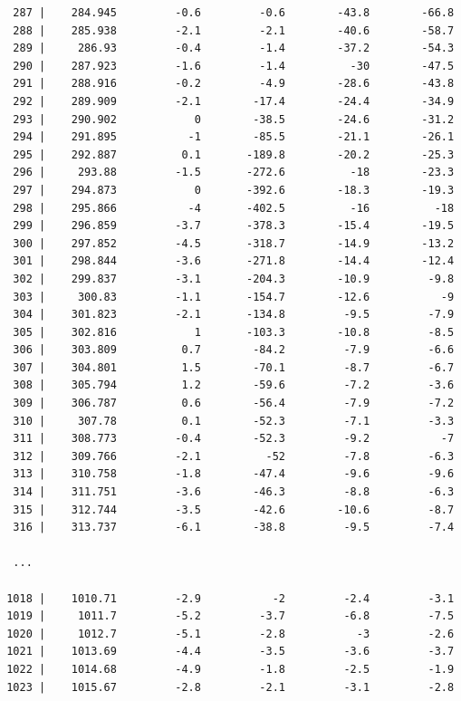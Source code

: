 \documentclass{article}[11pt]
\begin{document}
\begin{verbatim}
  287 |    284.945         -0.6         -0.6        -43.8        -66.8
  288 |    285.938         -2.1         -2.1        -40.6        -58.7
  289 |     286.93         -0.4         -1.4        -37.2        -54.3
  290 |    287.923         -1.6         -1.4          -30        -47.5
  291 |    288.916         -0.2         -4.9        -28.6        -43.8
  292 |    289.909         -2.1        -17.4        -24.4        -34.9
  293 |    290.902            0        -38.5        -24.6        -31.2
  294 |    291.895           -1        -85.5        -21.1        -26.1
  295 |    292.887          0.1       -189.8        -20.2        -25.3
  296 |     293.88         -1.5       -272.6          -18        -23.3
  297 |    294.873            0       -392.6        -18.3        -19.3
  298 |    295.866           -4       -402.5          -16          -18
  299 |    296.859         -3.7       -378.3        -15.4        -19.5
  300 |    297.852         -4.5       -318.7        -14.9        -13.2
  301 |    298.844         -3.6       -271.8        -14.4        -12.4
  302 |    299.837         -3.1       -204.3        -10.9         -9.8
  303 |     300.83         -1.1       -154.7        -12.6           -9
  304 |    301.823         -2.1       -134.8         -9.5         -7.9
  305 |    302.816            1       -103.3        -10.8         -8.5
  306 |    303.809          0.7        -84.2         -7.9         -6.6
  307 |    304.801          1.5        -70.1         -8.7         -6.7
  308 |    305.794          1.2        -59.6         -7.2         -3.6
  309 |    306.787          0.6        -56.4         -7.9         -7.2
  310 |     307.78          0.1        -52.3         -7.1         -3.3
  311 |    308.773         -0.4        -52.3         -9.2           -7
  312 |    309.766         -2.1          -52         -7.8         -6.3
  313 |    310.758         -1.8        -47.4         -9.6         -9.6
  314 |    311.751         -3.6        -46.3         -8.8         -6.3
  315 |    312.744         -3.5        -42.6        -10.6         -8.7
  316 |    313.737         -6.1        -38.8         -9.5         -7.4

  ...

 1018 |    1010.71         -2.9           -2         -2.4         -3.1
 1019 |     1011.7         -5.2         -3.7         -6.8         -7.5
 1020 |     1012.7         -5.1         -2.8           -3         -2.6
 1021 |    1013.69         -4.4         -3.5         -3.6         -3.7
 1022 |    1014.68         -4.9         -1.8         -2.5         -1.9
 1023 |    1015.67         -2.8         -2.1         -3.1         -2.8
\end{verbatim}
\end{document}
